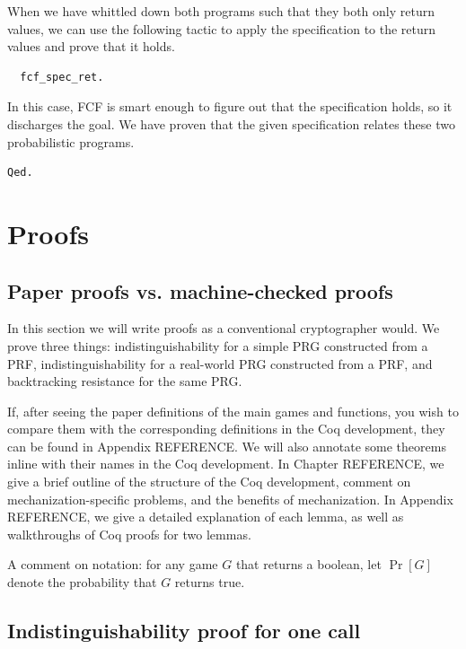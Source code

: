 \documentclass[12pt,lot, lof]{puthesis}
\begin{document}
{When we have whittled down both programs such that they both only return values, we can use the following tactic to apply the specification to the return values and prove that it holds. 

\begin{lstlisting}
  fcf_spec_ret.
\end{lstlisting}

In this case, FCF is smart enough to figure out that the specification holds, so it discharges the goal. We have proven that the given specification relates these two probabilistic programs. 

\begin{lstlisting}
Qed.
\end{lstlisting}



\chapter{Proofs}

\section{Paper proofs vs. machine-checked proofs}

In this section we will write proofs as a conventional cryptographer would. We prove three things: indistinguishability for a simple PRG constructed from a PRF, indistinguishability for a real-world PRG constructed from a PRF, and backtracking resistance for the same PRG.

If, after seeing the paper definitions of the main games and functions, you wish to compare them with the corresponding definitions in the Coq development, they can be found in Appendix REFERENCE. We will also annotate some theorems inline with their names in the Coq development. In Chapter REFERENCE, we give a brief outline of the structure of the Coq development, comment on mechanization-specific problems, and the benefits of mechanization. In Appendix REFERENCE, we give a detailed explanation of each lemma, as well as walkthroughs of Coq proofs for two lemmas.

A comment on notation: for any game $G$ that returns a boolean, let $\Pr[G]$ denote the probability that $G$ returns true. 

\section{Indistinguishability proof for one call}

}
\end{document}
